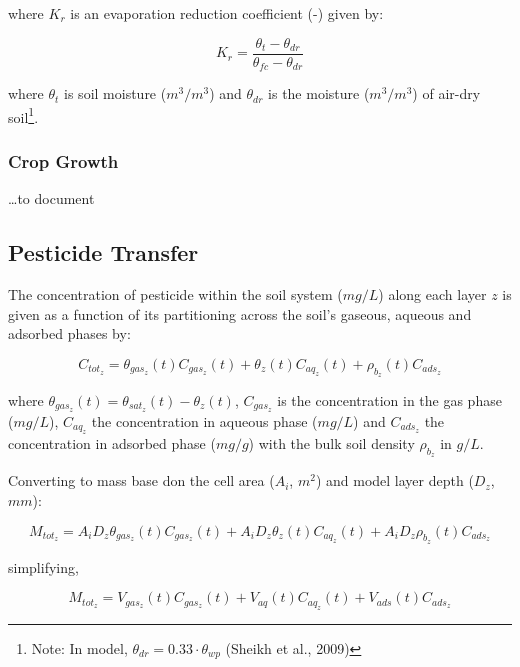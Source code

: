 \documentclass[]{article}
\let\rmarkdownfootnote\footnote%
\def\footnote{\protect\rmarkdownfootnote}
\begin{document}
where \(K_r\) is an evaporation reduction coefficient (-) given by:

\begin{equation}
K_r = \frac{ \theta_t - \theta_{dr} }{ \theta_{fc} - \theta_{dr} }
\label{eq:Kr}  
\end{equation}

where \(\theta_t\) is soil moisture (\(m^3/m^3\)) and \(\theta_{dr}\) is
the moisture (\(m^3/m^3\)) of air-dry
soil\footnote{Note: In model, $\theta_{dr} = 0.33 \cdot \theta_{wp}$ (Sheikh et al., 2009)}.

\hypertarget{crop-growth}{%
\subsubsection{Crop Growth}\label{crop-growth}}

\ldots{}to document

\hypertarget{pesticide-transfer}{%
\subsection{Pesticide Transfer}\label{pesticide-transfer}}

The concentration of pesticide within the soil system (\(mg/L\)) along
each layer \(z\) is given as a function of its partitioning across the
soil's gaseous, aqueous and adsorbed phases by:

\begin{equation}
C_{tot_z} = \theta_{gas_z}(t)C_{gas_z}(t) + \theta_z(t)C_{aq_z}(t) + \rho_{b_z}(t)C_{ads_z}
\label{eq:conc_tot}  
\end{equation}

where \(\theta_{gas_z}(t) = \theta_{sat_z}(t) - \theta_{z}(t)\),
\(C_{gas_z}\) is the concentration in the gas phase (\(mg/L\)),
\(C_{aq_z}\) the concentration in aqueous phase (\(mg/L\)) and
\(C_{ads_z}\) the concentration in adsorbed phase (\(mg/g\)) with the
bulk soil density \(\rho_{b_z}\) in \(g/L\).

Converting to mass base don the cell area (\(A_i\), \(m^2\)) and model
layer depth (\(D_z\), \(mm\)):

\begin{equation}
M_{tot_z} = A_iD_z\theta_{gas_z}(t)C_{gas_z}(t) + A_iD_z\theta_z(t)C_{aq_z}(t) + A_iD_z\rho_{b_z}(t)C_{ads_z}
\label{eq:mass_tot}  
\end{equation}

simplifying,

\begin{equation}
M_{tot_z} = V_{gas_z}(t)C_{gas_z}(t) + V_{aq}(t)C_{aq_z}(t) + V_{ads}(t)C_{ads_z}
\label{eq:mass_tot_simple}  
\end{equation}
\end{document}

